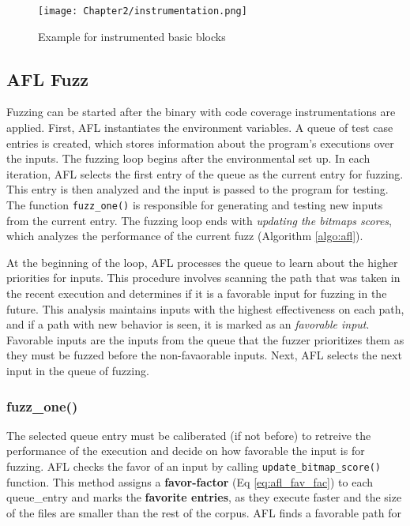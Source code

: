 \begin{figure}[htpb]
    \texttt{[image: Chapter2/instrumentation.png]}
    \centering
    \captionsetup{justification=centering}
    \caption{Example for instrumented basic blocks}
    \label{fig:instrumentation}
\end{figure}

\subsection{AFL Fuzz}

Fuzzing can be started after the binary with code coverage instrumentations are applied. First, AFL instantiates the environment variables. A queue of test case entries is created, which stores information about the program's executions over the inputs. The fuzzing loop begins after the environmental set up. In each iteration, AFL selects the first entry of the queue as the current entry for fuzzing. This entry is then analyzed and the input is passed to the program for testing. The function \texttt{fuzz\_one()} is responsible for generating and testing new inputs from the current entry. The fuzzing loop ends with \textit{updating the bitmaps scores}, which analyzes the performance of the current fuzz (Algorithm \ref{algo:afl}).




At the beginning of the loop, AFL processes the queue to learn about the higher priorities for inputs. This procedure involves scanning the path that was taken in the recent execution and determines if it is a favorable input for fuzzing in the future. This analysis maintains inputs with the highest effectiveness on each path, and if a path with new behavior is seen, it is marked as an \textit{favorable input}. Favorable inputs are the inputs from the queue that the fuzzer prioritizes them as they must be fuzzed before the non-favaorable inputs. Next, AFL selects the next input in the queue of fuzzing.

\subsubsection{fuzz\_one()}



The selected queue entry must be caliberated (if not before) to retreive the performance of the execution and decide on how favorable the input is for fuzzing. AFL checks the favor of an input by calling \texttt{update\_bitmap\_score()} function. This method assigns a \textbf{favor-factor} (Eq \ref{eq:afl_fav_fac}) to each queue\_entry and marks the \textbf{favorite entries}, as they execute faster and the size of the files are smaller than the rest of the corpus. AFL finds a favorable path for  \cite{afl_git} 

